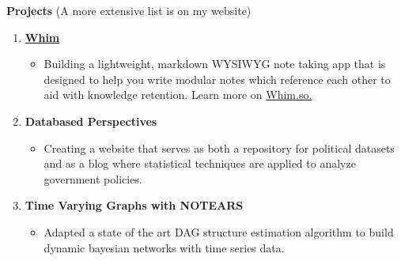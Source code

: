 \documentclass[letterpaper,11pt]{article}
\newlength{\outerbordwidth}
\newcommand{\resitem}[1]{\item #1 \vspace{-2pt}}
\newcommand{\resheading}[1]{\vspace{0pt} %
  \parbox{\textwidth}{\setlength{\FrameSep}{\outerbordwidth}
    \begin{shaded}
\setlength{\fboxsep}{0pt}\framebox[\textwidth][l]{\setlength{\fboxsep}{3.5pt}\fcolorbox{shadecolorB}{shadecolorB}{\textbf{\sffamily{\mbox{~}\makebox[7.262in][l]{\large #1} \vphantom{p\^{E}}}}}} %
    \end{shaded}
  }\vspace{-7pt} %
}
\begin{document}
\vspace{-10pt}

\begin{mybox}
	\hspace{-8pt} \textbf{Projects}  \fontsize{10.5}{15}\selectfont   (A more extensive list is on my website)
\end{mybox}


\vspace{-5pt}
\begin{enumerate}[leftmargin=10pt]
\setlength\itemsep{1em}

\item[] \href{https://whim.so/}{\textbf{Whim}}\\
\vspace{-4pt}
\begin{itemize}
	\resitem{Building a lightweight, markdown WYSIWYG note taking app that is designed to help you write modular notes which reference each other to aid with knowledge retention. Learn more on \href{https://whim.so/}{Whim.so.}}
\end{itemize}

\vspace{-12pt}

\item[] \textbf{Databased Perspectives}\\
\vspace{-4pt}
\begin{itemize}
	\resitem{Creating a website that serves as both a repository for political datasets and as a blog where statistical techniques are applied to analyze government policies.}
\end{itemize}

\vspace{-12pt}

\item[] \textbf{Time Varying Graphs with NOTEARS}\\
\vspace{-4pt}
\begin{itemize}
	\resitem{Adapted a state of the art DAG structure estimation algorithm to build dynamic bayesian networks with time series data.}
\end{itemize}

\end{enumerate}
\end{document}
